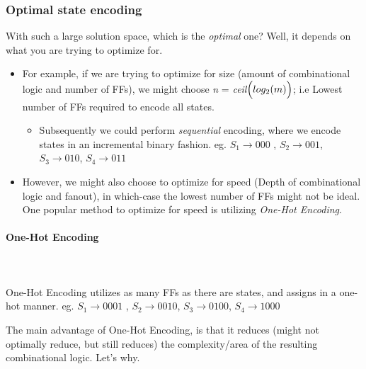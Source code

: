 \documentclass{article}
\begin{document}
\newpage
\subsubsection{Optimal state encoding}
With such a large solution space, which is the \textit{optimal} one? Well, it depends on what you are trying to optimize for.

\begin{itemize}
    \item 
    For example, if we are trying to optimize for size (amount of combinational logic and number of FFs),
    we might choose \textit{n} = \textit{ceil}$\Bigl( log_{2}(m) \Bigr)$; i.e Lowest number of FFs required to encode all states. 
        \begin{itemize}
            \item Subsequently we could perform \textit{sequential} encoding, where we encode states in an incremental binary fashion. \newline
                  eg. $S_{1} \xrightarrow{} 000$ , $S_{2} \xrightarrow{} 001$, $S_{3} \xrightarrow{} 010$, $S_{4} \xrightarrow{} 011$
        \end{itemize}
    \item
    However, we might also choose to optimize for speed (Depth of combinational logic and fanout), in which-case the lowest number of FFs might not be ideal.
    One popular method to optimize for speed is utilizing \textit{One-Hot Encoding}.
\end{itemize}

\paragraph{One-Hot Encoding}\mbox{}\\\\
One-Hot Encoding utilizes as many FFs as there are states, and assigns in a one-hot manner. \newline
eg. $S_{1} \xrightarrow{} 0001$ , $S_{2} \xrightarrow{} 0010$, $S_{3} \xrightarrow{} 0100$, $S_{4} \xrightarrow{} 1000$

The main advantage of One-Hot Encoding, is that it reduces (might not optimally reduce, but still reduces) the complexity/area of the resulting combinational logic. Let's why.
\end{document}

